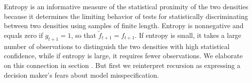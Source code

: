 Entropy is an informative measure of the statistical  proximity of the two densities because it determines the limiting   behavior of tests for statistically discriminating between  two densities
using samples of finite length. Entropy is nonnegative and equals zero if $g_{t+1} = 1$, so that $\tilde f_{t+1} = f_{t+1}$.  If entropy is  small, it takes a  large number of observations   to distinguish the two densities with high statistical confidence, while if entropy is large, it requires fewer observations. We elaborate on  this connection in section .  But first we reinterpret recursion  as expressing
a decision maker's fears about model misspecification.
%
%



